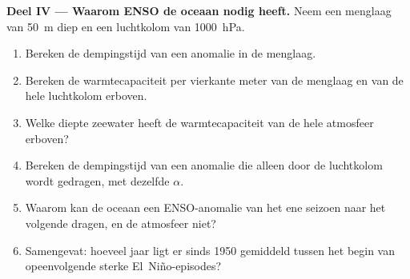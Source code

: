 \begin{problem}
\medskip\noindent\textbf{Deel IV --- Waarom ENSO de oceaan nodig heeft.}
Neem een menglaag van \qty{50}{m} diep en een luchtkolom van \qty{1000}{hPa}.
\begin{enumerate}[resume]
  \item Bereken de dempingstijd van een anomalie in de menglaag.
  \item Bereken de warmtecapaciteit per vierkante meter van de menglaag en van de hele
        luchtkolom erboven.
  \item Welke diepte zeewater heeft de warmtecapaciteit van de hele atmosfeer erboven?
  \item Bereken de dempingstijd van een anomalie die alleen door de luchtkolom wordt gedragen, met dezelfde
        $\alpha$.
  \item Waarom kan de oceaan een ENSO-anomalie van het ene seizoen naar het volgende dragen, en de
        atmosfeer niet?
  \item Samengevat: hoeveel jaar ligt er sinds 1950 gemiddeld tussen het begin van opeenvolgende sterke
        El~Niño-episodes?
\end{enumerate}
\end{problem}
